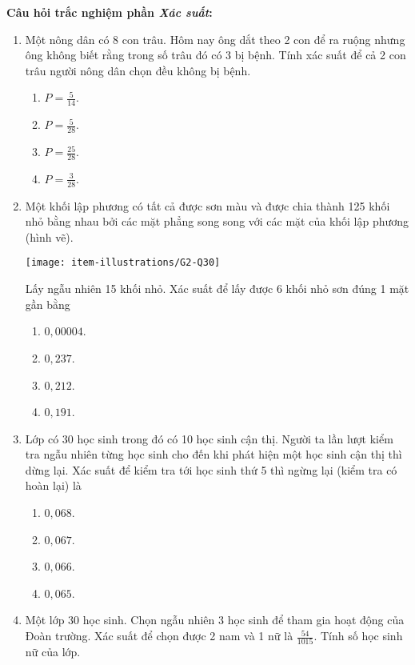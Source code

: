 \noindent\textbf{Câu hỏi trắc nghiệm phần \textit{Xác suất}:}
\begin{enumerate}[label=\textbf{Câu \arabic*.},align=left,left=0cm..0cm,itemindent=*]
	\item Một nông dân có 8 con trâu. Hôm nay ông dắt theo 2 con để ra ruộng nhưng ông không biết rằng trong số trâu đó có 3 bị bệnh. Tính xác suất để cả 2 con trâu người nông dân chọn đều không bị bệnh.
	\begin{enumerate}[label=\textbf{\Alph*.},align=left,left=1cm..0cm,itemindent=*]
		\item $P=\frac 5{14}$. \item $P=\frac 5{28}$. \item $P=\frac{25}{28}$. \item $P=\frac 3{28}$.
	\end{enumerate}
	\item Một khối lập phương có tất cả được sơn màu và được chia thành 125 khối nhỏ bằng nhau bởi các mặt phẳng song song với các mặt của khối lập phương (hình vẽ).\par
	{\centering\texttt{[image: item-illustrations/G2-Q30]}\par}
	Lấy ngẫu nhiên 15 khối nhỏ. Xác suất để lấy được 6 khối nhỏ sơn đúng 1 mặt gần bằng
	\begin{enumerate}[label=\textbf{\Alph*.},align=left,left=1cm..0cm,itemindent=*]
		\item $0,00004$. \item $0,237$. \item $0,212$. \item $0,191$.
	\end{enumerate}
	\item Lớp có 30 học sinh trong đó có 10 học sinh cận thị. Người ta lần lượt kiểm tra ngẫu nhiên từng học sinh cho đến khi phát hiện một học sinh cận thị thì dừng lại. Xác suất để kiểm tra tới học sinh thứ 5 thì ngừng lại (kiểm tra có hoàn lại) là
	\begin{enumerate}[label=\textbf{\Alph*.},align=left,left=1cm..0cm,itemindent=*]
		\item $0,068$. \item $0,067$. \item $0,066$. \item $0,065$.
	\end{enumerate}
	\item Một lớp 30 học sinh. Chọn ngẫu nhiên 3 học sinh để tham gia hoạt động của Đoàn trường. Xác suất để chọn được 2 nam và 1 nữ là $\frac{54}{1015}$. Tính số học sinh nữ của lớp.

\end{enumerate}
